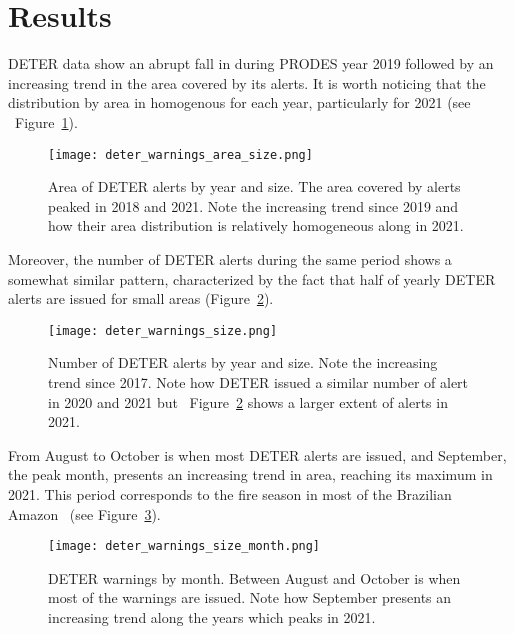 \section{Results}

DETER data show an abrupt fall in during PRODES year 2019 followed by an increasing trend in the area covered by its alerts. It is worth noticing that the distribution by area in homogenous for each year, particularly for 2021 (see ~Figure~\ref{fig:deter_warnings_area_size}).

\begin{figure}[h] 
    \begin{center}
    \texttt{[image: deter\_warnings\_area\_size.png]}
    \caption{Area of DETER alerts by year and size. The area covered by alerts
        peaked in 2018 and 2021. Note the increasing trend since 2019 and how
        their area distribution is relatively homogeneous along in 2021.}
    \label{fig:deter_warnings_area_size}
    \end{center}
\end{figure}

Moreover, the number of DETER alerts during the same period shows a somewhat similar pattern, characterized by the fact that half of yearly DETER alerts are issued for small areas (Figure~\ref{fig:deter_warnings_size}).

\begin{figure}[h] 
    \begin{center}
    \texttt{[image: deter\_warnings\_size.png]}
    \caption{Number of DETER alerts by year and size. Note the increasing trend
        since 2017. Note how DETER issued a similar number of alert in 2020 and
        2021 but ~Figure~\ref{fig:deter_warnings_size} shows a larger extent of
        alerts in 2021.}
    \label{fig:deter_warnings_size}
    \end{center}
\end{figure}

From August to October is when most DETER alerts are issued, and September, the peak month, presents an increasing trend in area, reaching its maximum in 2021.
This period corresponds to the fire season in most of the Brazilian Amazon~\cite{carvalho2021} (see Figure~\ref{fig:deter_warnings_size_month}). 

\begin{figure}[h] 
    \begin{center}
    \texttt{[image: deter\_warnings\_size\_month.png]}
    \caption{DETER warnings by month. Between August and October is when most
        of the warnings are issued. Note how September presents an increasing 
        trend along the years which peaks in 2021.}
    \label{fig:deter_warnings_size_month}
    \end{center}
\end{figure}

